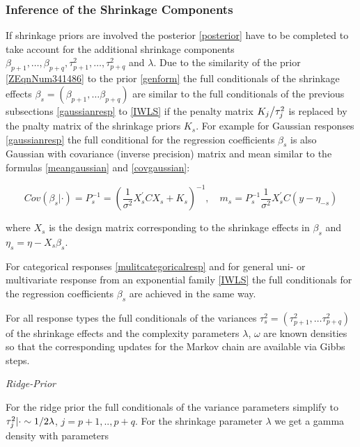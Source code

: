 \documentclass[11pt,a4paper,twoside]{bayesxarticle}
\begin{document}
\subsubsection{Inference of the Shrinkage Components}
\label{Inference_Shrinkage}

If shrinkage priors are involved the posterior \eqref{posterior} have to be completed to take account for the additional
shrinkage components $\beta _{p+1} ,\ldots,\beta _{p+q} ,\tau _{p+1}^{2} ,\ldots,\tau _{p+q}^{2} $ and $\lambda $. Due to the
similarity of the prior \eqref{ZEqnNum341486} to the prior \eqref{genform} the full conditionals of the shrinkage effects
$\beta _{s} =\left(\beta _{p+1} ,\ldots \beta _{p+q} \right)$ are similar to the full conditionals of the previous subsections
\ref{gaussianresp} to \ref{IWLS} if the penalty matrix ${K_{j} \mathord{\left/ {\vphantom {K_{j}  \tau _{j}^{2} }} \right.
\kern-\nulldelimiterspace} \tau _{j}^{2} } $ is replaced by the pnalty matrix of the shrinkage priors $K_{s} $. For example for
Gaussian responses \ref{gaussianresp} the full conditional for the regression coefficients $\beta _{s} $ is also Gaussian with
covariance (inverse precision) matrix and mean similar to the formulas \eqref{meangaussian} and \eqref{covgaussian}:

\[Cov\left(\beta _{s} |\cdot \right)=P_{s}^{-1} =\left(\frac{1}{\sigma ^{2} } X_{s}
^{{'} } CX_{s} +K_{s} \right)^{-1} ,\quad m_{s} =P_{s}^{-1} \frac{1}{\sigma ^{2}
} X_{s} ^{{'} } C\left(y-\eta _{-s} \right)\]

where $X_{s} $ is the design matrix corresponding to the shrinkage effects in $\beta _{s} $ and $\eta
_{s} =\eta -X_{s} \beta _{s} $.

For categorical responses \ref{mulitcategoricalresp} and for general uni- or multivariate
response from an exponential family \ref{IWLS} the full conditionals for the
regression coefficients $\beta _{s} $ are achieved in the same way.

For all response types the full conditionals of the variances $\tau _{s}^{2} =\left(\tau _{p+1}^{2} ,\ldots\tau _{p+q}^{2}
\right)$ of the shrinkage effects and the complexity parameters $\lambda$, $\omega $ are known densities so that the
corresponding updates for the Markov chain are available via Gibbs steps.

{\em Ridge-Prior}

For the ridge prior the full conditionals of the variance parameters simplify to $\tau _{j}^{2} |\cdot \sim {1\mathord{\left/
{\vphantom {1 2\lambda }} \right. \kern-\nulldelimiterspace} 2\lambda } $, $j=p+1,..,p+q$. For the shrinkage parameter $\lambda
$ we get a gamma density with parameters
\end{document}
